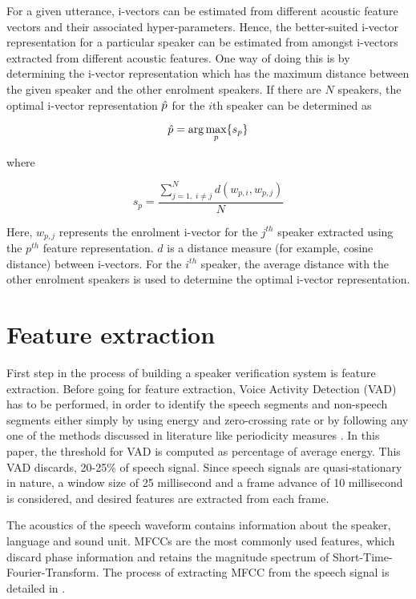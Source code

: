 \documentclass{article}
\begin{document}
For a given utterance, i-vectors can be estimated from different acoustic
feature vectors and their associated hyper-parameters. Hence, the
better-suited i-vector representation for a particular speaker can be estimated
from amongst i-vectors extracted from different acoustic features. One way of
doing this is by determining the i-vector representation which has the maximum
distance between the given speaker and the other enrolment speakers. If there
are $N$ speakers, the optimal i-vector representation $\Hat{p}$ 
for the $i$th speaker can be determined as

\begin{equation}
\Hat{p} = \arg\max_p \{s_p\}
\label{eq:p_hat}
\end{equation}

where 

\begin{equation}
s_p = \frac{\displaystyle \sum_{j=1, \; i \neq j}^N d(w_{p,i},w_{p,j})}{N}
\label{eq:sp}
\end{equation}

Here, $w_{p,j}$ represents the enrolment i-vector for the $j^{th}$ speaker
extracted using the $p^{th}$ feature representation. $d$ is a distance measure (for
example, cosine distance) between i-vectors. For the $i^{th}$ speaker, the average
distance with the other enrolment speakers is used to determine the optimal
i-vector representation. 

\section{Feature extraction}
\label{sec:featExt}
First step in the process of building a speaker verification system is feature extraction.
Before going for feature extraction, Voice Activity Detection (VAD) has to be performed, in order to identify the speech segments and non-speech segments either simply by using energy
 \cite{vadenergy, vadhari} and zero-crossing \cite{vadzc} rate or by following any one of the methods discussed in literature like periodicity measures \cite{vadtucker}.
In this paper, the threshold for VAD is computed as percentage of average energy. This VAD discards, 20-25\% of speech signal. Since speech signals are quasi-stationary in nature, a window size of 25 millisecond and a frame advance of 10 millisecond is considered, and desired features are extracted from each frame. 

The acoustics of the speech waveform contains information about the speaker, language and sound unit. MFCCs are the most commonly used features, which discard phase information and retains the magnitude spectrum of Short-Time-Fourier-Transform. The process of extracting MFCC from the speech signal is detailed in \cite{mel}.
\end{document}
